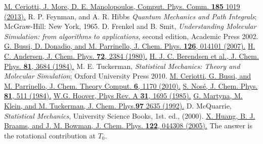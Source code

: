 \documentclass[a4paper,11pt]{scrartcl}
\begin{document}
\begin{thebibliography}{50}
 \href{https://doi.org/10.1016/j.cpc.2013.10.027}{M. Ceriotti, J. More, D. E. Manolopoulos, Comput. Phys. Comm. \textbf{185} 1019 (2013).}
 R. P. Feynman, and A. R. Hibbs \textit{Quantum Mechanics and Path Integrals}; McGraw-Hill: New York, 1965.
 D. Frenkel and B. Smit, \textit{Understanding Molecular Simulation: from algorithms to applications}, second edition, Academic Press 2002.
 \href{http://dx.doi.org/10.1063/1.2408420}{G. Bussi, D. Donadio, and M. Parrinello, J. Chem. Phys. \textbf{126}, 014101 (2007).}
 \href{http://dx.doi.org/10.1063/1.439486}{H. C. Andersen, J. Chem. Phys. \textbf{72}, 2384 (1980).}
 \href{http://dx.doi.org/10.1063/1.448118}{H. J. C. Berendsen et al., J. Chem. Phys. \textbf{81}, 3684 (1984).}
 M. E. Tuckerman, \textit{Statistical Mechanics: Theory and Molecular Simulation}; Oxford University Press 2010. 
 \href{http://pubs.acs.org/doi/abs/10.1021/ct900563s}{M. Ceriotti, G. Bussi, and M. Parrinello, J. Chem. Theory Comput. \textbf{6}, 1170 (2010).}
 \href{http://dx.doi.org/10.1063/1.447334}{S. Nos\'{e}, J. Chem. Phys. \textbf{81}, 511 (1984).} \href{https://doi.org/10.1103/PhysRevA.31.1695}{W.G. Hoover, Phys Rev. A \textbf{31}, 1695 (1985).}
 \href{https://doi.org/10.1063/1.463940}{G. Martyna, M. Klein, and M. Tuckerman,  J. Chem. Phys.\textbf{97} 2635 (1992).}
 D. McQuarrie, \textit{Statistical Mechanics}, University Science Books, 1st. ed., (2000).
 \href{http://aip.scitation.org/doi/10.1063/1.1927529}{X. Huang, B. J. Braams, and J. M. Bowman, J. Chem. Phys. \textbf{122}, 044308 (2005).}
 The answer is the rotational contribution at $T_0$.

\end{thebibliography}
\end{document}
